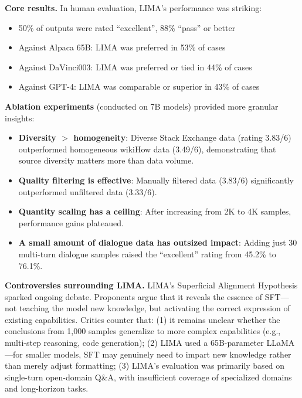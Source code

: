 \textbf{Core results.}
In human evaluation, LIMA's performance was striking:
\begin{itemize}[leftmargin=1.5em]
  \item 50\% of outputs were rated ``excellent'', 88\% ``pass'' or better
  \item Against Alpaca 65B: LIMA was preferred in 53\% of cases
  \item Against DaVinci003: LIMA was preferred or tied in 44\% of cases
  \item Against GPT-4: LIMA was comparable or superior in 43\% of cases
\end{itemize}

\textbf{Ablation experiments} (conducted on 7B models) provided more granular insights:
\begin{itemize}[leftmargin=1.5em]
  \item \textbf{Diversity $>$ homogeneity}:
    Diverse Stack Exchange data (rating 3.83/6) outperformed homogeneous wikiHow data (3.49/6),
    demonstrating that source diversity matters more than data volume.
  \item \textbf{Quality filtering is effective}:
    Manually filtered data (3.83/6) significantly outperformed unfiltered data (3.33/6).
  \item \textbf{Quantity scaling has a ceiling}:
    After increasing from 2K to 4K samples, performance gains plateaued.
  \item \textbf{A small amount of dialogue data has outsized impact}:
    Adding just 30 multi-turn dialogue samples raised the ``excellent'' rating from 45.2\% to 76.1\%.
\end{itemize}

\textbf{Controversies surrounding LIMA.}
LIMA's Superficial Alignment Hypothesis sparked ongoing debate.
Proponents argue that it reveals the essence of SFT---not teaching the model new knowledge, but activating the correct expression of existing capabilities.
Critics counter that:
(1) it remains unclear whether the conclusions from 1,000 samples generalize to more complex capabilities (e.g., multi-step reasoning, code generation);
(2) LIMA used a 65B-parameter LLaMA---for smaller models, SFT may genuinely need to impart new knowledge rather than merely adjust formatting;
(3) LIMA's evaluation was primarily based on single-turn open-domain Q\&A, with insufficient coverage of specialized domains and long-horizon tasks.

